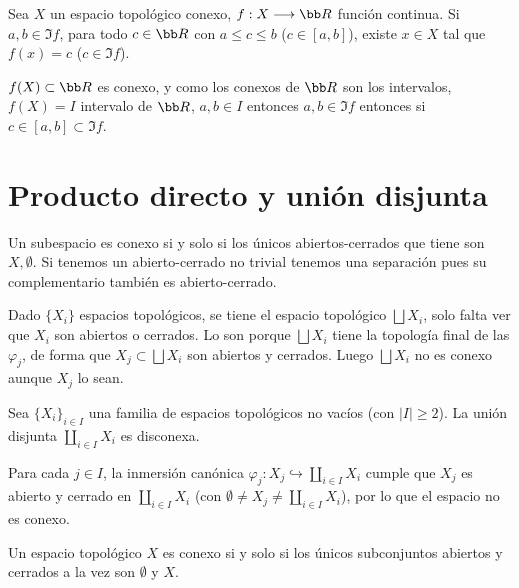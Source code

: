 \begin{cor}
     Sea $X$ un espacio topol\'ogico conexo, $f:X \longrightarrow \bb R$ funci\'on continua. Si $a,b \in \Im f$, para todo $c\in \bb R$ con $a\leq c \leq b$ ($c\in [a,b]$), existe $x\in X$ tal que $f(x) = c$ ($c\in \Im f$). 
\end{cor}
\begin{dem}
    $f(X) \subset \bb R$ es conexo, y como los conexos de $\bb R$ son los intervalos, $f(X)=I$ intervalo de $\bb R$, $a, b\in I$ entonces $a,b \in \Im f$ entonces si $c\in [a,b] \subset \Im f$. 
\end{dem}
\section{Producto directo y uni\'on disjunta}
\begin{obs}
    Un subespacio es conexo si y solo si los \'unicos abiertos-cerrados que tiene son $X, \emptyset$. Si tenemos un abierto-cerrado no trivial tenemos una separaci\'on pues su complementario tambi\'en es abierto-cerrado. 
\end{obs}


Dado $\{X_i\}$ espacios topol\'ogicos, se tiene el espacio topol\'ogico $\bigsqcup X_i$, solo falta ver que $X_i$ son abiertos o cerrados. Lo son porque $\bigsqcup X_i$ tiene la topolog\'ia final de las $\varphi_j$, de forma que $X_j\subset \bigsqcup X_i$ son abiertos y cerrados. Luego $\bigsqcup X_i$ no es conexo aunque $X_j$ lo sean. 

\begin{prop}
Sea $\{X_i\}_{i \in I}$ una familia de espacios topológicos no vacíos (con $|I| \ge 2$). La unión disjunta $\coprod_{i \in I} X_i$ es disconexa.
\end{prop}
\begin{dem}
    Para cada $j \in I$, la inmersión canónica $\varphi_j : X_j \hookrightarrow \coprod_{i \in I} X_i$ cumple que $X_j$ es abierto y cerrado en $\coprod_{i \in I} X_i$ (con $\emptyset \neq X_j \neq \coprod_{i \in I} X_i$), por lo que el espacio no es conexo.
\end{dem}

\begin{prop}
    Un espacio topológico $X$ es conexo si y solo si los únicos subconjuntos abiertos y cerrados a la vez son $\emptyset$ y $X$.
\end{prop}


